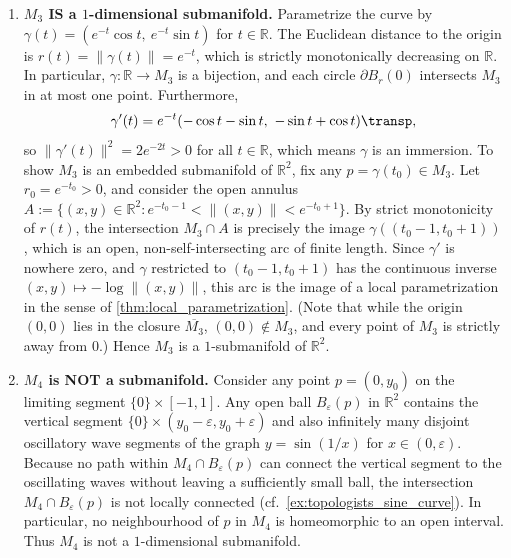 \begin{exercisesolution}
\begin{enumerate}[label=\textbf{(\alph*)}]
  \item \textbf{$M_3$ IS a $1$-dimensional submanifold.}
    Parametrize the curve by $\gamma(t) = (e^{-t}\cos t,\ e^{-t}\sin t)$ for $t \in \mathbb{R}$.
    The Euclidean distance to the origin is $r(t) = \|\gamma(t)\| = e^{-t}$, which is strictly
    monotonically decreasing on $\mathbb{R}$. In particular, $\gamma : \mathbb{R} \to M_3$ is a bijection,
    and each circle $\partial B_r(0)$ intersects $M_3$ in at most one point.
    Furthermore,
    \[\gamma'(t) = e^{-t}(-\cos t - \sin t,\ -\sin t + \cos t)\transp,\]
    so $\|\gamma'(t)\|^2 = 2e^{-2t} > 0$ for all $t \in \mathbb{R}$, which means $\gamma$ is an immersion.
    To show $M_3$ is an embedded submanifold of $\mathbb{R}^2$, fix any $p = \gamma(t_0) \in M_3$.
    Let $r_0 = e^{-t_0} > 0$, and consider the open annulus $A := \{(x,y) \in \mathbb{R}^2 : e^{-t_0-1} < \|(x,y)\| < e^{-t_0+1}\}$.
    By strict monotonicity of $r(t)$, the intersection $M_3 \cap A$ is precisely the image
    $\gamma((t_0-1, t_0+1))$, which is an open, non-self-intersecting arc of finite length.
    Since $\gamma'$ is nowhere zero, and $\gamma$ restricted to $(t_0-1,t_0+1)$ has the continuous
    inverse $(x,y) \mapsto -\log\|(x,y)\|$, this arc is the image of a local parametrization in
    the sense of \cref{thm:local_parametrization}.
    (Note that while the origin $(0,0)$ lies in the closure $\overline{M_3}$, $(0,0) \notin M_3$,
    and every point of $M_3$ is strictly away from $0$.) Hence $M_3$ is a $1$-submanifold of $\mathbb{R}^2$.

  \item \textbf{$M_4$ is NOT a submanifold.}
    Consider any point $p = (0, y_0)$ on the limiting segment $\{0\} \times [-1, 1]$.
    Any open ball $B_\varepsilon(p)$ in $\mathbb{R}^2$ contains the vertical segment $\{0\} \times (y_0-\varepsilon, y_0+\varepsilon)$
    and also infinitely many disjoint oscillatory wave segments of the graph $y = \sin(1/x)$ for $x \in (0, \varepsilon)$.
    Because no path within $M_4 \cap B_\varepsilon(p)$ can connect the vertical segment to the oscillating
    waves without leaving a sufficiently small ball, the intersection $M_4 \cap B_\varepsilon(p)$ is not
    locally connected (cf.\ \cref{ex:topologists_sine_curve}). In particular, no neighbourhood of $p$ in
    $M_4$ is homeomorphic to an open interval. Thus $M_4$ is not a $1$-dimensional submanifold.
\end{enumerate}
\end{exercisesolution}


